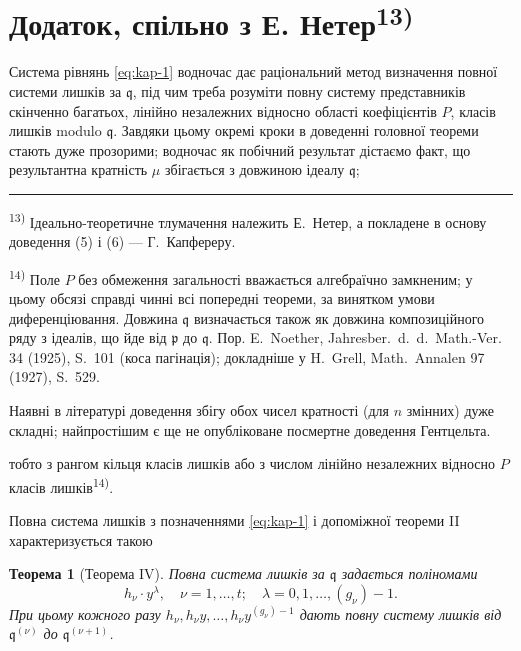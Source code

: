 \documentclass[11pt]{article}
\newcommand{\foreign}[1]{#1}
\theoremstyle{plain}
\newtheorem{satz}{Теорема}
\begin{document}
\newpage
\section*{Додаток, спільно з Е. Нетер\textsuperscript{13)}}

Система рівнянь \eqref{eq:kap-1} водночас дає раціональний метод
визначення повної системи лишків за $\mathfrak{q}$, під чим треба
розуміти повну систему представників скінченно багатьох, лінійно
незалежних відносно області коефіцієнтів $P$, класів лишків modulo
$\mathfrak{q}$. Завдяки цьому окремі кроки в доведенні головної
теореми стають дуже прозорими; водночас як побічний результат
дістаємо факт, що результантна кратність $\mu$ збігається з
довжиною ідеалу $\mathfrak{q}$;

\vspace{0.5em}
\noindent\rule{\textwidth}{0.4pt}
\vspace{0.3em}

{\footnotesize
\textsuperscript{13)} Ідеально-теоретичне тлумачення належить Е.\ Нетер, а
покладене в основу доведення (5) і (6) --- Г.\ Капфереру.

\textsuperscript{14)} Поле $P$ без обмеження загальності вважається
алгебраїчно замкненим; у цьому обсязі справді чинні всі попередні
теореми, за винятком умови диференціювання. Довжина $\mathfrak{q}$
визначається також як довжина композиційного ряду з ідеалів, що йде
від $\mathfrak{p}$ до $\mathfrak{q}$. Пор. E.\ Noether,
\foreign{Jahresber.\ d.\ d.\ Math.-Ver.} 34 (1925), S.~101
(коса пагінація); докладніше у H.\ Grell, \foreign{Math.\ Annalen} 97
(1927), S.~529.

Наявні в літературі доведення збігу обох чисел кратності (для $n$
змінних) дуже складні; найпростішим є ще не опубліковане посмертне
доведення Гентцельта.
}

\vspace{1em}
тобто з рангом кільця класів лишків або з числом лінійно незалежних
відносно $P$ класів лишків\textsuperscript{14)}.

Повна система лишків з позначеннями \eqref{eq:kap-1} і допоміжної
теореми II характеризується такою

\begin{satz}[Теорема IV]\label{satz:kap-IV}
Повна система лишків за $\mathfrak{q}$ задається поліномами
\[
h_{\nu} \cdot y^{\lambda}, \quad \nu = 1, \ldots, t; \quad \lambda = 0, 1, \ldots, (g_{\nu})-1.
\]
При цьому кожного разу
$h_{\nu}, h_{\nu}y, \ldots, h_{\nu}y^{(g_{\nu})-1}$ дають повну
систему лишків від $\mathfrak{q}^{(\nu)}$ до $\mathfrak{q}^{(\nu+1)}$.
\end{satz}
\end{document}
